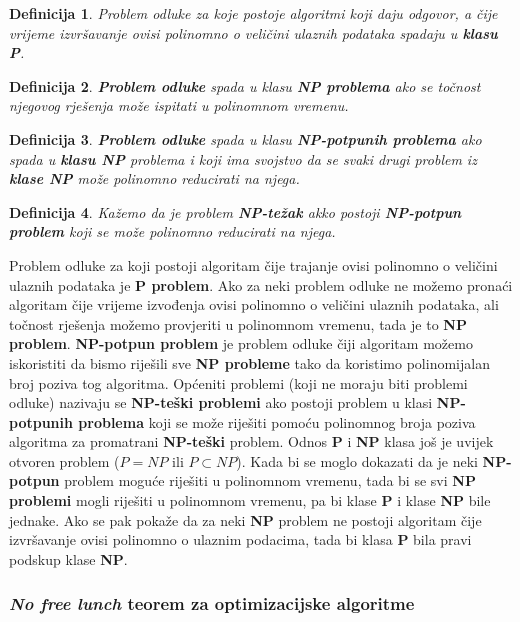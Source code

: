 \documentclass[times, utf8, diplomski, numeric]{fer}
\newtheorem{definition}{Definicija}
\begin{document}
\begin{definition}
Problem odluke za koje postoje algoritmi koji daju odgovor, a čije vrijeme izvršavanje ovisi polinomno o veličini ulaznih podataka spadaju u \textbf{klasu P}.
\end{definition}

\begin{definition}
\textbf{Problem odluke} spada u klasu \textbf{NP problema} ako se točnost njegovog rješenja može ispitati u polinomnom vremenu. 
\end{definition}

\begin{definition}
\textbf{Problem odluke} spada u klasu \textbf{NP-potpunih problema} ako spada u \textbf{klasu NP} problema i koji ima svojstvo da se svaki drugi problem iz \textbf{klase NP} može polinomno reducirati na njega. 
\end{definition}

\begin{definition}
Kažemo da je problem \textbf{NP-težak} akko postoji \textbf{NP-potpun problem} koji se može polinomno reducirati na njega.
\end{definition}

Problem odluke za koji postoji algoritam čije trajanje ovisi polinomno o veličini ulaznih podataka je \textbf{P problem}. Ako za neki problem odluke ne možemo pronaći algoritam čije vrijeme izvođenja ovisi polinomno o veličini ulaznih podataka, ali točnost rješenja možemo provjeriti u polinomnom vremenu, tada je to \textbf{NP problem}. \textbf{NP-potpun problem} je problem odluke čiji algoritam možemo iskoristiti da bismo riješili sve \textbf{NP probleme} tako da koristimo polinomijalan broj poziva tog algoritma. Općeniti problemi (koji ne moraju biti problemi odluke) nazivaju se \textbf{NP-teški problemi} ako postoji problem u klasi \textbf{NP-potpunih problema} koji se može riješiti pomoću polinomnog broja poziva algoritma za promatrani \textbf{NP-teški} problem. Odnos \textbf{P} i \textbf{NP} klasa još je uvijek otvoren problem ($P=NP$ ili $P\subset NP$). Kada bi se moglo dokazati da je neki \textbf{NP-potpun} problem moguće riješiti u polinomnom vremenu, tada bi se svi \textbf{NP problemi} mogli riješiti u polinomnom vremenu, pa bi klase \textbf{P} i klase \textbf{NP} bile jednake. Ako se pak pokaže da za neki \textbf{NP} problem ne postoji algoritam čije izvršavanje ovisi polinomno o ulaznim podacima, tada bi klasa \textbf{P} bila pravi podskup klase \textbf{NP}.

\subsubsection{\emph{No free lunch} teorem za optimizacijske algoritme}
\end{document}
